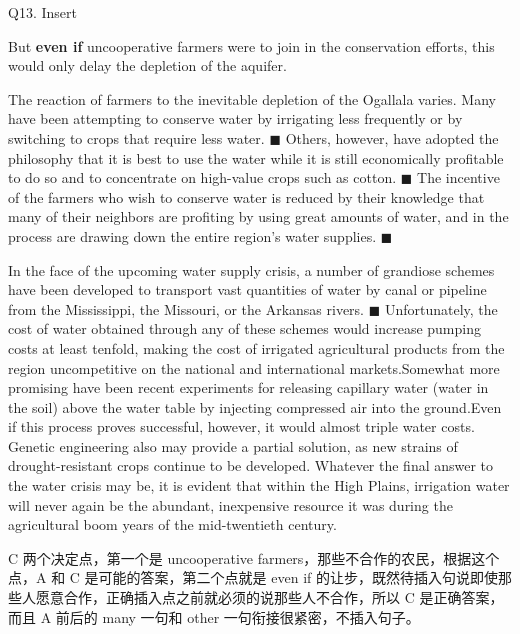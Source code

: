 \begin{blk}
    \begin{qst}
        Q13. Insert
    \end{qst}

    \begin{chc}
        But \textbf{even if} uncooperative farmers were to join in the conservation efforts, this would only delay the depletion of the aquifer.
    \end{chc}

    \begin{psgq}
        The reaction of farmers to the inevitable depletion of the Ogallala varies. Many have been attempting to conserve water by irrigating less frequently or by switching to crops that require less water. $\blacksquare$ Others, however, have adopted the philosophy that it is best to use the water while it is still economically profitable to do so and to concentrate on high-value crops such as cotton.   $\blacksquare$ The incentive of the farmers who wish to conserve water is reduced by their knowledge that many of their neighbors are profiting by using great amounts of water, and in the process are drawing down the entire region’s water supplies. $\blacksquare$

        In the face of the upcoming water supply crisis, a number of grandiose schemes have been developed to transport vast quantities of water by canal or pipeline from the Mississippi, the Missouri, or the Arkansas rivers. $\blacksquare$ Unfortunately, the cost of water obtained through any of these schemes would increase pumping costs at least tenfold, making the cost of irrigated agricultural products from the region uncompetitive on the national and international markets.Somewhat more promising have been recent experiments for releasing capillary water (water in the soil) above the water table by injecting compressed air into the ground.Even if this process proves successful, however, it would almost triple water costs. Genetic engineering also may provide a partial solution, as new strains of drought-resistant crops continue to be developed. Whatever the final answer to the water crisis may be, it is evident that within the High Plains, irrigation water will never again be the abundant, inexpensive resource it was during the agricultural boom years of the mid-twentieth century.
    \end{psgq}

    \begin{nlz}
        C 两个决定点，第一个是 uncooperative farmers，那些不合作的农民，根据这个点，A 和 C 是可能的答案，第二个点就是 even if 的让步，既然待插入句说即使那些人愿意合作，正确插入点之前就必须的说那些人不合作，所以 C 是正确答案，而且 A 前后的 many 一句和 other 一句衔接很紧密，不插入句子。
    \end{nlz}
\end{blk}
